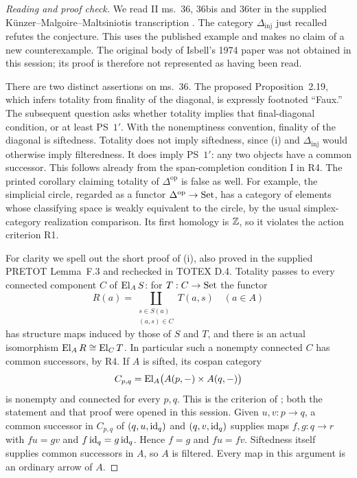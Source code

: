 \begin{proof}[Reading and proof check]
We read II ms.\ 36, 36bis and 36ter in the supplied
K\"unzer--Malgoire--Maltsiniotis transcription
\citep{GrothendieckDerivateurs}. The category
$\Delta_{\mathrm{inj}}$ just recalled refutes the conjecture. This
uses the published example and makes no claim of a new counterexample.
The original body of Isbell's 1974 paper was not obtained in this
session; its proof is therefore not represented as having been read.

There are two distinct assertions on ms.\ 36. The proposed
Proposition~2.19, which infers totality from finality of the diagonal,
is expressly footnoted ``Faux.'' The subsequent question asks whether
totality implies that final-diagonal condition, or at least PS~$1'$.
With the nonemptiness convention, finality of the diagonal is
siftedness. Totality does not imply siftedness, since (i) and
$\Delta_{\mathrm{inj}}$ would otherwise imply filteredness. It does
imply PS~$1'$: any two objects have a common successor. This follows
already from the span-completion condition I in R4. The printed
corollary claiming totality of $\Delta^{\mathrm{op}}$ is false as
well. For example, the simplicial circle, regarded as a functor
$\Delta^{\mathrm{op}}\to\mathrm{Set}$, has a category of elements whose
classifying space is weakly equivalent to the circle, by the usual
simplex-category realization comparison. Its first homology is
$\mathbb Z$, so it violates the action criterion R1.

For clarity we spell out the short proof of (i), also proved in the
supplied PRETOT Lemma~F.3 and rechecked in TOTEX D.4. Totality passes
to every connected component $C$ of $\operatorname{El}_A S$: for $T:C\to\mathrm{Set}$ the
functor
\[
 R(a)=\coprod_{\substack{s\in S(a)\\(a,s)\in C}}T(a,s)
 \quad(a\in A)
\]
has structure maps induced by those of $S$ and $T$, and there is an
actual isomorphism $\operatorname{El}_A R\cong\operatorname{El}_C T$. In particular such a
nonempty connected $C$ has common successors, by R4. If $A$ is
sifted, its cospan category
\[
 C_{p,q}=\operatorname{El}_A\bigl(A(p,-)\times A(q,-)\bigr)
\]
is nonempty and connected for every $p,q$. This is the criterion of
\citet[Example~15.2(c), proof in \S15.9]{GabrielUlmer1971}; both the
statement and that proof were opened in this session. Given
$u,v:p\to q$, a common successor in $C_{p,q}$ of
$(q,u,\operatorname{id}_q)$ and $(q,v,\operatorname{id}_q)$ supplies maps $f,g:q\to r$ with
$fu=gv$ and $f\operatorname{id}_q=g\operatorname{id}_q$. Hence $f=g$ and $fu=fv$.
Siftedness itself supplies common successors in $A$, so $A$ is
filtered. Every map in this argument is an ordinary arrow of $A$.


\end{proof}
